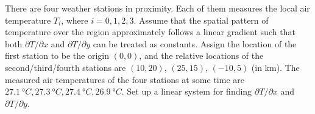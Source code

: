 \begin{exmp}
\label{exmp:weatherstats}
There are four weather stations in proximity. Each of them measures the local air temperature $T_i$, where $i = 0,1,2,3$. Assume that the spatial pattern of temperature over the region approximately follows a linear gradient such that both $\partial T/\partial x$ and $\partial T/\partial y$ can be treated as constants. Assign the location of the first station to be the origin $(0,0)$, and the relative locations of the second/third/fourth stations are $(10,20)$, $(25,15)$, $(-10,5)$ (in \si{\km}). The measured air temperatures of the four stations at some time are $\SI{27.1}{\degree C}, \SI{27.3}{\degree C}, \SI{27.4}{\degree C}, \SI{26.9}{\degree C}$. Set up a linear system for finding $\partial T/\partial x$ and $\partial T/\partial y$.
\end{exmp}
